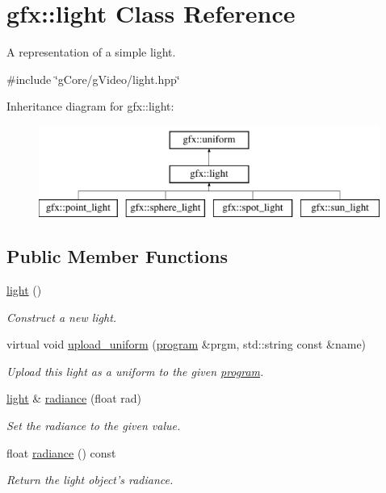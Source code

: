\hypertarget{classgfx_1_1light}{\section{gfx\-:\-:light Class Reference}
\label{classgfx_1_1light}
}


A representation of a simple light.  




{\ttfamily \#include \char`\"{}g\-Core/g\-Video/light.\-hpp\char`\"{}}

Inheritance diagram for gfx\-:\-:light\-:\begin{figure}[H]
\begin{center}
\leavevmode
\includegraphics[height=3.000000cm]{classgfx_1_1light}
\end{center}
\end{figure}
\subsection*{Public Member Functions}
\begin{DoxyCompactItemize}
\item 
\hypertarget{classgfx_1_1light_ab6991678227d431b3d022892602d0f60}{\hyperlink{classgfx_1_1light_ab6991678227d431b3d022892602d0f60}{light} ()}\label{classgfx_1_1light_ab6991678227d431b3d022892602d0f60}

\begin{DoxyCompactList}\small\item\em Construct a new light. \end{DoxyCompactList}\item 
virtual void \hyperlink{classgfx_1_1light_a7b974f1340562d8740192b2ff0d62f93}{upload\-\_\-uniform} (\hyperlink{classgfx_1_1program}{program} \&prgm, std\-::string const \&name)
\begin{DoxyCompactList}\small\item\em Upload this light as a uniform to the given \hyperlink{classgfx_1_1program}{program}. \end{DoxyCompactList}\item 
\hyperlink{classgfx_1_1light}{light} \& \hyperlink{classgfx_1_1light_a03e6675928b2d7c1d6ccdf7c18412f41}{radiance} (float rad)
\begin{DoxyCompactList}\small\item\em Set the radiance to the given value. \end{DoxyCompactList}\item 
float \hyperlink{classgfx_1_1light_afb6bafddd687f9ca3b46e40143a4eeb0}{radiance} () const 
\begin{DoxyCompactList}\small\item\em Return the light object's radiance. \end{DoxyCompactList}\end{DoxyCompactItemize}
